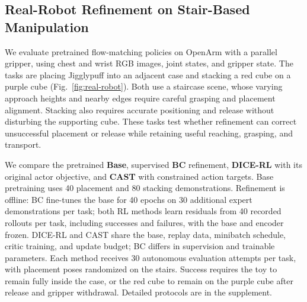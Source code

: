 \subsection{Real-Robot Refinement on Stair-Based Manipulation}
\label{sec:exp-real-robot}

We evaluate pretrained flow-matching policies on OpenArm with a parallel gripper, using chest and wrist RGB images, joint states, and gripper state. 
The tasks are placing Jigglypuff into an adjacent case and stacking a red cube on a purple cube (Fig.~\ref{fig:real-robot}). 
Both use a staircase scene, whose varying approach heights and nearby edges require careful grasping and placement alignment. Stacking also requires accurate positioning and release without disturbing the supporting cube. These tasks test whether refinement can correct unsuccessful placement or release while retaining useful reaching, grasping, and transport.

We compare the pretrained \textbf{Base}, supervised \textbf{BC} refinement, \textbf{DICE-RL} with its original actor objective, and \textbf{CAST} with constrained action targets. Base pretraining uses 40 placement and 80 stacking demonstrations. Refinement is offline: BC fine-tunes the base for 40 epochs on 30 additional expert demonstrations per task; both RL methods learn residuals from 40 recorded rollouts per task, including successes and failures, with the base and encoder frozen. DICE-RL and CAST share the base, replay data, minibatch schedule, critic training, and update budget; BC differs in supervision and trainable parameters. Each method receives 30 autonomous evaluation attempts per task, with placement poses randomized on the stairs. Success requires the toy to remain fully inside the case, or the red cube to remain on the purple cube after release and gripper withdrawal. Detailed protocols are in the supplement.


